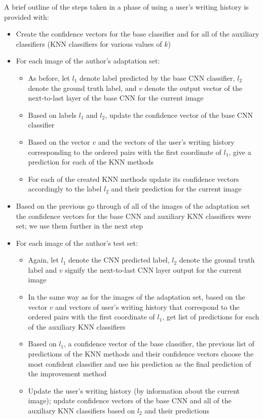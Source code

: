 \documentclass{article}
\begin{document}
A brief outline of the steps taken in a phase of using a user's writing history is provided with: 
\begin{itemize}
  \item Create the confidence vectors for the base classifier and for all of the auxiliary classifiers (KNN classifiers for various values of $k$)
  \item For each image of the author's adaptation set: 
  \begin{itemize}
    \item As before, let $l_1$ denote label predicted by the base CNN classifier, $l_2$ denote the ground truth label, and $v$ denote the output vector of the next-to-last layer of the base CNN for the current image
    \item Based on labels $l_1$ and $l_2$, update the confidence vector of the base CNN classifier %
    \item Based on the vector $v$ and the vectors of the user's writing history corresponding to the ordered pairs with the first coordinate of $l_1$, 
    give a prediction for each of the KNN methods
    \item For each of the created KNN methods update its confidence vectors accordingly to the label $l_2$ and their prediction for the current image
  \end{itemize}
  \item Based on the previous go through of all of the images of the adaptation set the confidence vectors for the base CNN and auxiliary KNN classifiers were set; we use them further in the next step %
  \item For each image of the author's test set:
  \begin{itemize}
    \item Again, let $l_1$ denote the CNN predicted label, $l_2$ denote the ground truth label and $v$ signify the next-to-last CNN layer output for the current image
    \item In the same way as for the images of the adaptation set, based on the vector $v$ and vectors of user's writing history that correspond to the ordered pairs with the first coordinate of $l_1$, get list of predictions for each of the auxiliary KNN classifiers
    \item Based on $l_1$, a confidence vector of the base classifier, the previous list of predictions of the KNN methods and their confidence vectors choose the most confident classifier and use his prediction as the final prediction of the improvement method
    \item Update the user's writing history (by information about the current image); update confidence vectors of the base CNN and all of the auxiliary KNN classifiers based on $l_2$ and their predictions
  \end{itemize}
\end{itemize}
\end{document}
